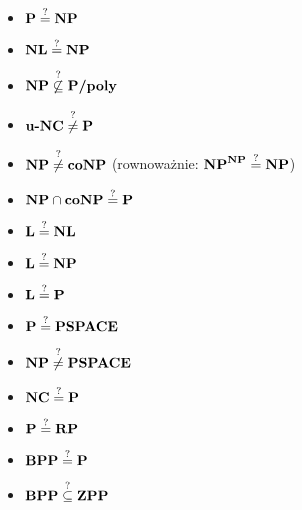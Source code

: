 \begin{itemize}
    \item $\P \mayeq \NP$
    \item $\NL \mayeq \NP$
    \item $\NP \stackrel{?}{\not\subseteq}  \P\poly$
    \item $\u\NC \mayneq \P$
    \item $\NP \mayneq \co\NP$ (rownoważnie: $\NP^\NP \mayeq \NP$)
    \item $\NP \cap \co\NP \mayeq \P$
    \item $\L \mayeq \NL$
    \item $\L \mayeq \NP$
    \item $\L \mayeq \P$
    \item $\P \mayeq \PSPACE$
    \item $\NP \mayneq \PSPACE$
    \item $\NC \mayeq \P$
    \item $\P \mayeq \RP$
    \item $\BPP \mayeq \P$
    \item $\BPP \maysubseteq \ZPP$
    
\end{itemize}